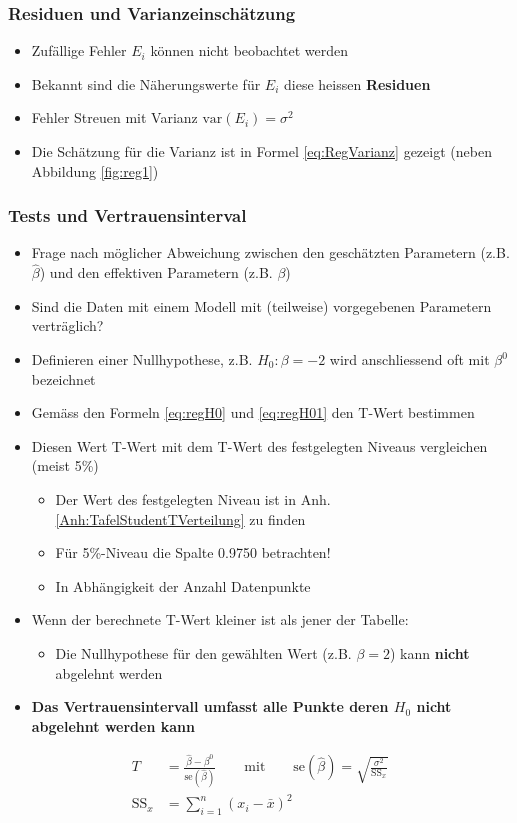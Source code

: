 \subsubsection{Residuen und Varianzeinschätzung}
\begin{itemize}
	\item Zufällige Fehler $E_i$ können nicht beobachtet werden
	\item Bekannt sind die Näherungswerte für $E_i$ diese heissen \textbf{Residuen}
	\item Fehler Streuen mit Varianz $\text{var}(E_i) = \sigma^2$
	\item Die Schätzung für die Varianz ist in Formel \ref{eq:RegVarianz} gezeigt (neben Abbildung \ref{fig:reg1})
\end{itemize}

\subsubsection{Tests und Vertrauensinterval}
\begin{itemize}
	\item Frage nach möglicher Abweichung zwischen den geschätzten Parametern (z.B. $\hat{\beta}$) und den effektiven Parametern (z.B. $\beta$)
	\item Sind die Daten mit einem Modell  mit (teilweise) vorgegebenen Parametern verträglich?
	\item Definieren einer Nullhypothese, z.B. $H_0: \beta = -2$ wird anschliessend oft mit $\beta^0$ bezeichnet
	\item Gemäss den Formeln \ref{eq:regH0} und \ref{eq:regH01} den T-Wert bestimmen
	\item Diesen Wert T-Wert mit dem T-Wert des festgelegten Niveaus vergleichen (meist 5\%)
	\begin{itemize}
		\item Der Wert des festgelegten Niveau ist in Anh. \ref{Anh:TafelStudentTVerteilung} zu finden
		\item Für 5\%-Niveau die Spalte 0.9750 betrachten!
		\item In Abhängigkeit der Anzahl Datenpunkte
	\end{itemize}
	\item Wenn der berechnete T-Wert kleiner ist als jener der Tabelle: 
	\begin{itemize}
		\item Die Nullhypothese für den gewählten Wert (z.B. $\beta=2$) kann \textbf{nicht} abgelehnt werden
	\end{itemize}
	\item \textbf{Das Vertrauensintervall umfasst alle Punkte deren $H_0$ nicht abgelehnt werden kann}
\end{itemize}
\begin{align}
	\label{eq:regH0}
	T&= \frac{\hat{\beta}-\beta^0}{\text{se}(\hat{\beta})} \qquad \text{mit} \qquad \text{se}(\hat{\beta})=\sqrt{\frac{\sigma^2}{\text{SS}_x}}\\
	\label{eq:regH01}
	\text{SS}_x &= \sum_{i=1}^{n}(x_i-\bar{x})^2
\end{align}

